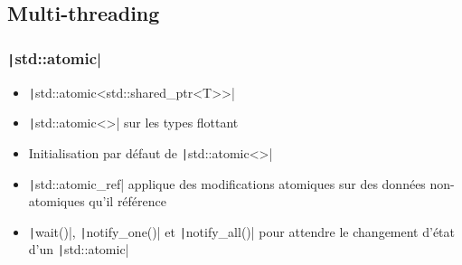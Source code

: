 \documentclass[C++.tex]{subfiles}
\begin{document}
\subsection*{Multi-threading}
\begin{frame}[fragile]
	\frametitle{\texttt|std::atomic|}
	\begin{itemize}
		\item \texttt|std::atomic<std::shared_ptr<T>>|
		\item \texttt|std::atomic<>| sur les types flottant
		\item Initialisation par défaut de \texttt|std::atomic<>|
		\item \texttt|std::atomic_ref| applique des modifications atomiques sur des données non-atomiques qu'il référence
		\item \texttt|wait()|, \texttt|notify_one()| et \texttt|notify_all()| pour attendre le changement d'état d'un \texttt|std::atomic|
	\end{itemize}
\end{frame}
\end{document}
